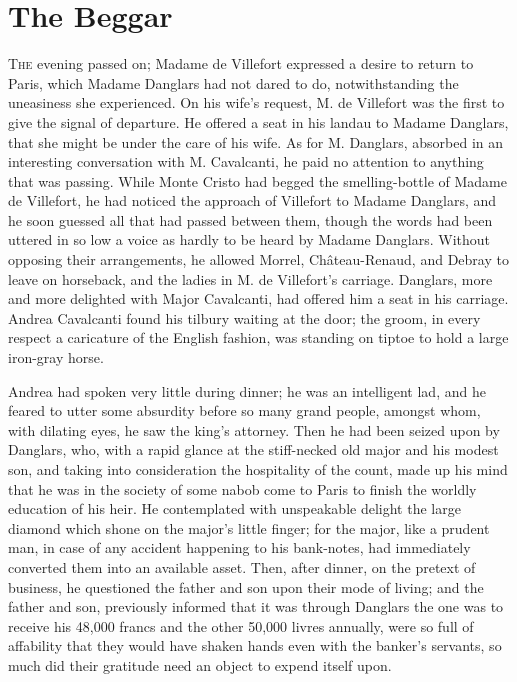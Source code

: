 \chapter{The Beggar} 

 \lettrine{T}{he} evening passed on; Madame de Villefort expressed a desire to return to Paris, which Madame Danglars had not dared to do, notwithstanding the uneasiness she experienced. On his wife's request, M. de Villefort was the first to give the signal of departure. He offered a seat in his landau to Madame Danglars, that she might be under the care of his wife. As for M. Danglars, absorbed in an interesting conversation with M. Cavalcanti, he paid no attention to anything that was passing. While Monte Cristo had begged the smelling-bottle of Madame de Villefort, he had noticed the approach of Villefort to Madame Danglars, and he soon guessed all that had passed between them, though the words had been uttered in so low a voice as hardly to be heard by Madame Danglars. Without opposing their arrangements, he allowed Morrel, Château-Renaud, and Debray to leave on horseback, and the ladies in M. de Villefort's carriage. Danglars, more and more delighted with Major Cavalcanti, had offered him a seat in his carriage. Andrea Cavalcanti found his tilbury waiting at the door; the groom, in every respect a caricature of the English fashion, was standing on tiptoe to hold a large iron-gray horse. 

 Andrea had spoken very little during dinner; he was an intelligent lad, and he feared to utter some absurdity before so many grand people, amongst whom, with dilating eyes, he saw the king's attorney. Then he had been seized upon by Danglars, who, with a rapid glance at the stiff-necked old major and his modest son, and taking into consideration the hospitality of the count, made up his mind that he was in the society of some nabob come to Paris to finish the worldly education of his heir. He contemplated with unspeakable delight the large diamond which shone on the major's little finger; for the major, like a prudent man, in case of any accident happening to his bank-notes, had immediately converted them into an available asset. Then, after dinner, on the pretext of business, he questioned the father and son upon their mode of living; and the father and son, previously informed that it was through Danglars the one was to receive his 48,000 francs and the other 50,000 livres annually, were so full of affability that they would have shaken hands even with the banker's servants, so much did their gratitude need an object to expend itself upon. 

